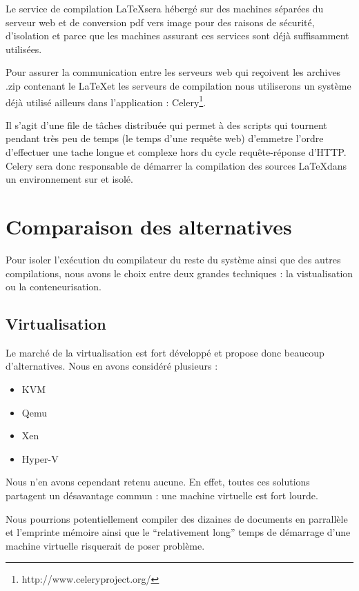 \documentclass[10pt,a4paper]{article}
\begin{document}
Le service de compilation \LaTeX sera hébergé sur des machines séparées du serveur web et de conversion pdf vers image pour des raisons de sécurité, d'isolation et parce que les machines assurant ces services sont déjà suffisamment utilisées.

Pour assurer la communication entre les serveurs web qui reçoivent les archives .zip contenant le \LaTeX et les serveurs de compilation nous utiliserons un système déjà utilisé ailleurs dans l'application :
Celery\footnote{http://www.celeryproject.org/}.

Il s'agit d'une file de tâches distribuée qui permet à des scripts qui tournent pendant très peu de temps (le temps d'une requête web) d'emmetre l'ordre d'effectuer une tache longue et complexe hors du cycle requête-réponse d'HTTP.
Celery sera donc responsable de démarrer la compilation des sources \LaTeX dans un environnement sur et isolé.


\section{Comparaison des alternatives}
Pour isoler l'exécution du compilateur du reste du système ainsi que des autres compilations, nous avons le choix entre deux grandes techniques : la vistualisation ou la conteneurisation.

\subsection{Virtualisation}

Le marché de la virtualisation est fort développé et propose donc beaucoup d'alternatives. Nous en avons considéré plusieurs :

\begin{itemize}
    \item{KVM}
    \item{Qemu}
    \item{Xen}
    \item{Hyper-V}
\end{itemize}

Nous n'en avons cependant retenu aucune. En effet, toutes ces solutions partagent un désavantage commun : une machine virtuelle est fort lourde.

Nous pourrions potentiellement compiler des dizaines de documents en parrallèle et l'emprinte mémoire ainsi que le ``relativement long'' temps de démarrage d'une machine virtuelle risquerait de poser problème.
\end{document}
